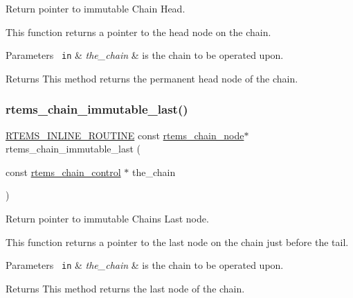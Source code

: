 Return pointer to immutable Chain Head. 

This function returns a pointer to the head node on the chain.


\begin{DoxyParams}[1]{Parameters}
\mbox{\texttt{ in}}  & {\em the\+\_\+chain} & is the chain to be operated upon.\\
\hline
\end{DoxyParams}
\begin{DoxyReturn}{Returns}
This method returns the permanent head node of the chain. 
\end{DoxyReturn}
\mbox{\label{group__ClassicChains_ga9bfc86b96b34e3b890397bbf7fe2f66f}} 
\subsubsection{\texorpdfstring{rtems\_chain\_immutable\_last()}{rtems\_chain\_immutable\_last()}}
{\footnotesize\ttfamily \mbox{\hyperlink{group__RTEMSScoreBaseDefs_gac216239df231d5dbd15e3520b0b9313f}{R\+T\+E\+M\+S\+\_\+\+I\+N\+L\+I\+N\+E\+\_\+\+R\+O\+U\+T\+I\+NE}} const \mbox{\hyperlink{structChain__Node__struct}{rtems\+\_\+chain\+\_\+node}}$\ast$ rtems\+\_\+chain\+\_\+immutable\+\_\+last (\begin{DoxyParamCaption}\item[{const \mbox{\hyperlink{unionChain__Control}{rtems\+\_\+chain\+\_\+control}} $\ast$}]{the\+\_\+chain }\end{DoxyParamCaption})}



Return pointer to immutable Chain\textquotesingle{}s Last node. 

This function returns a pointer to the last node on the chain just before the tail.


\begin{DoxyParams}[1]{Parameters}
\mbox{\texttt{ in}}  & {\em the\+\_\+chain} & is the chain to be operated upon.\\
\hline
\end{DoxyParams}
\begin{DoxyReturn}{Returns}
This method returns the last node of the chain. 
\end{DoxyReturn}
\mbox{\label{group__ClassicChains_gae90a97d8e1bc8e47669706ebf5c5dbf9}} 
